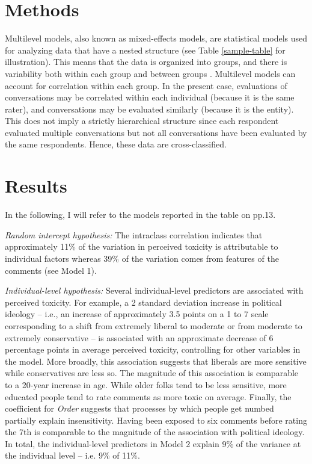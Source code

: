 \documentclass{article}
\begin{document}
\section{Methods}

Multilevel models, also known as mixed-effects models, are statistical models used for analyzing data that have a nested structure (see Table \ref{sample-table}  for illustration). This means that the data is organized into groups, and there is variability both within each group and between groups \citep{hox2017multilevel}. Multilevel models can account for correlation within each group. In the present case, evaluations of conversations may be correlated within each individual (because it is the same rater), and conversations may be evaluated similarly (because it is the entity). This does not imply a strictly hierarchical structure since each respondent evaluated multiple conversations but not all conversations have been evaluated by the same respondents. Hence, these data are cross-classified.

\section{Results}

In the following, I will refer to the models reported in the table on pp.13.

\textit{Random intercept hypothesis:} The intraclass correlation indicates that approximately 11\% of the variation in perceived toxicity is attributable to individual factors whereas 39\% of the variation comes from features of the comments (see Model 1). 

\textit{Individual-level hypothesis:} Several individual-level predictors are associated with perceived toxicity. For example, a 2 standard deviation increase in political ideology -- i.e., an increase of approximately 3.5 points on a 1 to 7 scale corresponding to a shift from extremely liberal to moderate or from moderate to extremely conservative -- is associated with an approximate decrease of 6 percentage points in average perceived toxicity, controlling for other variables in the model. More broadly, this association suggests that liberals are more sensitive while conservatives are less so. The magnitude of this association is comparable to a 20-year increase in age. While older folks tend to be less sensitive, more educated people tend to rate comments as more toxic on average. Finally, the coefficient for \textit{Order} suggests that processes by which people get numbed partially explain insensitivity. Having been exposed to six comments before rating the 7th is comparable to the magnitude of the association with political ideology. In total, the individual-level predictors in Model 2 explain 9\% of the variance at the individual level -- i.e. 9\% of 11\%.
\end{document}
